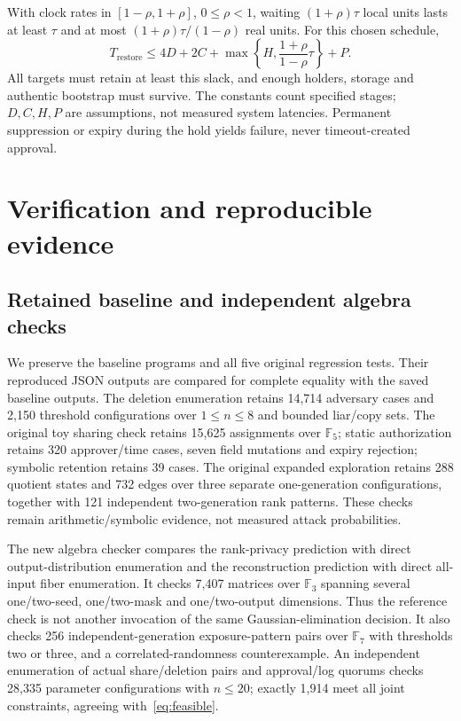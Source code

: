 \documentclass[pdflatex,sn-mathphys-num]{sn-jnl}
\theoremstyle{plain}
\theoremstyle{definition}
\newcommand{\F}{\mathbb{F}}
\begin{document}
With clock rates in $[1-\rho,1+\rho]$, $0\le\rho<1$, waiting $(1+\rho)\tau$ local units lasts at least $\tau$ and at most $(1+\rho)\tau/(1-\rho)$ real units. For this chosen schedule,
\begin{equation}\label{eq:deadline}
 T_{\mathrm{restore}}\le4D+2C+
 \max\!\left\{H,\frac{1+\rho}{1-\rho}\tau\right\}+P.
\end{equation}
All targets must retain at least this slack, and enough holders, storage and authentic bootstrap must survive. The constants count specified stages; $D,C,H,P$ are assumptions, not measured system latencies. Permanent suppression or expiry during the hold yields failure, never timeout-created approval.


\section{Verification and reproducible evidence}\label{sec:evaluation}

\subsection{Retained baseline and independent algebra checks}
We preserve the baseline programs and all five original regression tests. Their reproduced JSON outputs are compared for complete equality with the saved baseline outputs. The deletion enumeration retains 14,714 adversary cases and 2,150 threshold configurations over $1\le n\le8$ and bounded liar/copy sets. The original toy sharing check retains 15,625 assignments over $\F_5$; static authorization retains 320 approver/time cases, seven field mutations and expiry rejection; symbolic retention retains 39 cases. The original expanded exploration retains 288 quotient states and 732 edges over three separate one-generation configurations, together with 121 independent two-generation rank patterns. These checks remain arithmetic/symbolic evidence, not measured attack probabilities.

The new algebra checker compares the rank-privacy prediction with direct output-distribution enumeration and the reconstruction prediction with direct all-input fiber enumeration. It checks 7,407 matrices over $\F_3$ spanning several one/two-seed, one/two-mask and one/two-output dimensions. Thus the reference check is not another invocation of the same Gaussian-elimination decision. It also checks 256 independent-generation exposure-pattern pairs over $\F_7$ with thresholds two or three, and a correlated-randomness counterexample. An independent enumeration of actual share/deletion pairs and approval/log quorums checks 28,335 parameter configurations with $n\le20$; exactly 1,914 meet all joint constraints, agreeing with~\eqref{eq:feasible}.
\end{document}
